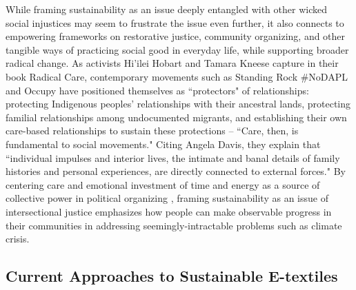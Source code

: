 While framing sustainability as an issue deeply entangled with other wicked social injustices may seem to frustrate the issue even further, it also connects to empowering frameworks on restorative justice, community organizing, and other tangible ways of practicing social good in everyday life, while supporting broader radical change. As activists Hi'ilei Hobart and Tamara Kneese capture in their book Radical Care, contemporary movements such as Standing Rock \#NoDAPL and Occupy have positioned themselves as ``protectors" of relationships: protecting Indigenous peoples' relationships with their ancestral lands, protecting familial relationships among undocumented migrants, and establishing their own care-based relationships to sustain these protections -- ``Care, then, is fundamental to social movements." \cite{hobart_radical_2020} Citing Angela Davis, they explain that ``individual impulses and interior lives, the intimate and banal details of family histories and personal experiences, are directly connected to external forces." By centering care and emotional investment of time and energy as a source of collective power in political organizing \cite{mcalevey_no_2016, sze_environmental_2020}, framing sustainability as an issue of intersectional justice emphasizes how people can make observable progress in their communities in addressing seemingly-intractable problems such as climate crisis.

\subsection{Current Approaches to Sustainable E-textiles}

